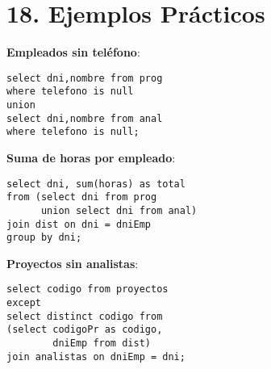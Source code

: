 \documentclass[10pt,a4paper,twocolumn]{article}
\begin{document}
\section*{18. Ejemplos Prácticos}

\textbf{Empleados sin teléfono}:
\begin{lstlisting}
select dni,nombre from prog
where telefono is null
union
select dni,nombre from anal
where telefono is null;
\end{lstlisting}

\textbf{Suma de horas por empleado}:
\begin{lstlisting}
select dni, sum(horas) as total
from (select dni from prog 
      union select dni from anal)
join dist on dni = dniEmp
group by dni;
\end{lstlisting}

\textbf{Proyectos sin analistas}:
\begin{lstlisting}
select codigo from proyectos
except
select distinct codigo from
(select codigoPr as codigo,
        dniEmp from dist)
join analistas on dniEmp = dni;
\end{lstlisting}
\end{document}
